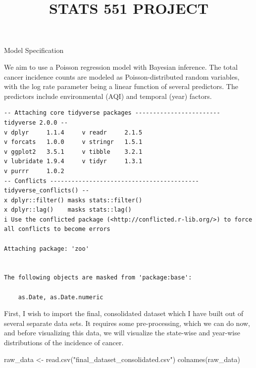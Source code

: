 \documentclass[
  12pt,
]{article}
\title{STATS 551 PROJECT}
\author{}
\date{}
\makeatletter
\let\oldparagraph\paragraph
\renewcommand{\paragraph}{
    \@ifstar
      \xxxParagraphStar
      \xxxParagraphNoStar
  }
\newcommand{\xxxParagraphStar}[1]{\oldparagraph*{#1}\mbox{}}
\newcommand{\xxxParagraphNoStar}[1]{\oldparagraph{#1}\mbox{}}
\newenvironment{Shaded}{\begin{snugshade}}{\end{snugshade}}
\newcommand{\FunctionTok}[1]{\textcolor[rgb]{0.28,0.35,0.67}{#1}}
\newcommand{\NormalTok}[1]{\textcolor[rgb]{0.00,0.23,0.31}{#1}}
\newcommand{\OtherTok}[1]{\textcolor[rgb]{0.00,0.23,0.31}{#1}}
\newcommand{\StringTok}[1]{\textcolor[rgb]{0.13,0.47,0.30}{#1}}
\makeatother
\begin{document}
\maketitle


\paragraph{Model Specification}\label{model-specification}

We aim to use a Poisson regression model with Bayesian inference. The
total cancer incidence counts are modeled as Poisson-distributed random
variables, with the log rate parameter being a linear function of
several predictors. The predictors include environmental (AQI) and
temporal (year) factors.

\begin{verbatim}
-- Attaching core tidyverse packages ------------------------ tidyverse 2.0.0 --
v dplyr     1.1.4     v readr     2.1.5
v forcats   1.0.0     v stringr   1.5.1
v ggplot2   3.5.1     v tibble    3.2.1
v lubridate 1.9.4     v tidyr     1.3.1
v purrr     1.0.2     
-- Conflicts ------------------------------------------ tidyverse_conflicts() --
x dplyr::filter() masks stats::filter()
x dplyr::lag()    masks stats::lag()
i Use the conflicted package (<http://conflicted.r-lib.org/>) to force all conflicts to become errors

Attaching package: 'zoo'


The following objects are masked from 'package:base':

    as.Date, as.Date.numeric
\end{verbatim}

First, I wish to import the final, consolidated dataset which I have
built out of several separate data sets. It requires some
pre-processing, which we can do now, and before visualizing this data,
we will visualize the state-wise and year-wise distributions of the
incidence of cancer.

\begin{Shaded}
\begin{Highlighting}[]
\NormalTok{raw\_data }\OtherTok{\textless{}{-}} \FunctionTok{read.csv}\NormalTok{(}\StringTok{"final\_dataset\_consolidated.csv"}\NormalTok{)}
\FunctionTok{colnames}\NormalTok{(raw\_data)}
\end{Highlighting}
\end{Shaded}
\end{document}
